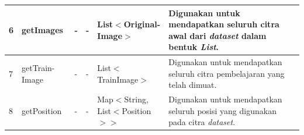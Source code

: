 \begin{small}
\begin{longtable}{|p{0.4cm}|p{2cm}|p{1.8cm}|p{1.8cm}|p{1.7cm}|p{3.55cm}|}
	\hline
	6 & getImages & - & - & List$<$\newline Original-\newline Image$>$ & Digunakan untuk mendapatkan seluruh citra awal dari \textit{dataset} dalam bentuk \textit{List}.\\
	\hline
	7 & getTrain-\newline Image & - & - & List$<$\newline TrainImage\newline$>$ & Digunakan untuk mendapatkan seluruh citra pembelajaran yang telah dimuat.\\
	\hline
	8 & getPosition & - & - & Map$<$\newline String, List$<$\newline Position$>$$>$ & Digunakan untuk mendapatkan seluruh posisi yang digunakan pada citra \textit{dataset}.\\
	\hline
\end{longtable}
\end{small}
\endgroup

